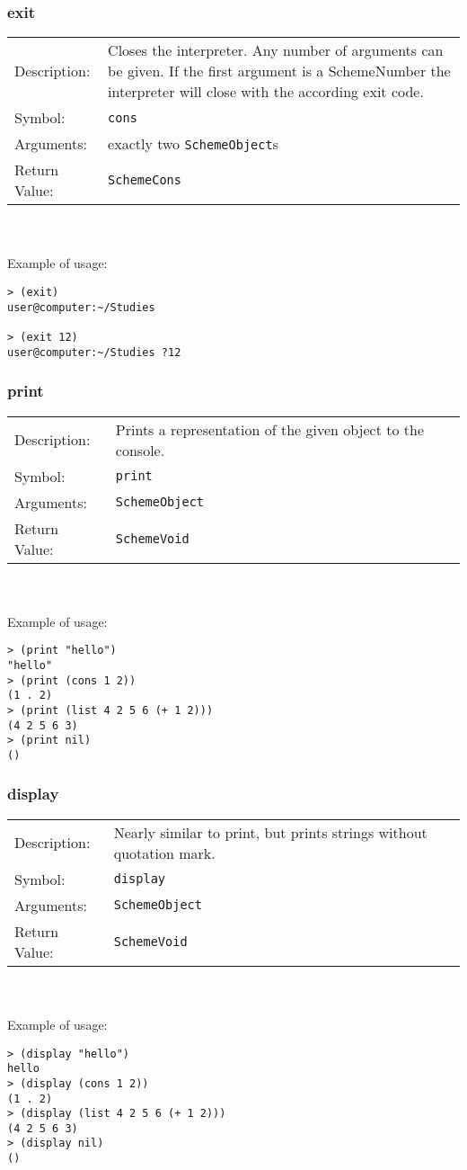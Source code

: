\documentclass[12pt,a4paper]{scrartcl}
\begin{document}
\subsubsection{exit}
\begin{tabular}{l  p{13cm}}
Description: & Closes the interpreter. Any number of arguments can be given. If the first argument is a SchemeNumber the interpreter will close with the according exit code.\\
Symbol: & \lstinline{cons}\\
Arguments: & exactly two \lstinline{SchemeObject}s\\
Return Value: & \lstinline{SchemeCons}
\end{tabular}
\\
\\
Example of usage:
\begin{lstlisting}
> (exit)
user@computer:~/Studies        

> (exit 12)
user@computer:~/Studies ?12        
\end{lstlisting}

\subsubsection{print}
\begin{tabular}{l  p{13cm}}
Description: & Prints a representation of the given object to the console.\\
Symbol: & \lstinline{print}\\
Arguments: & \lstinline{SchemeObject}\\
Return Value: & \lstinline{SchemeVoid}
\end{tabular}
\\
\\
Example of usage:
\begin{lstlisting}
> (print "hello")
"hello"
> (print (cons 1 2))
(1 . 2)
> (print (list 4 2 5 6 (+ 1 2)))
(4 2 5 6 3)
> (print nil)
()
\end{lstlisting}

\subsubsection{display}
\begin{tabular}{l  p{13cm}}
Description: & Nearly similar to print, but prints strings without quotation mark.\\
Symbol: & \lstinline{display}\\
Arguments: & \lstinline{SchemeObject}\\
Return Value: & \lstinline{SchemeVoid}
\end{tabular}
\\
\\
Example of usage:
\begin{lstlisting}
> (display "hello")
hello
> (display (cons 1 2))
(1 . 2)
> (display (list 4 2 5 6 (+ 1 2)))
(4 2 5 6 3)
> (display nil)
()
\end{lstlisting}
\end{document}
